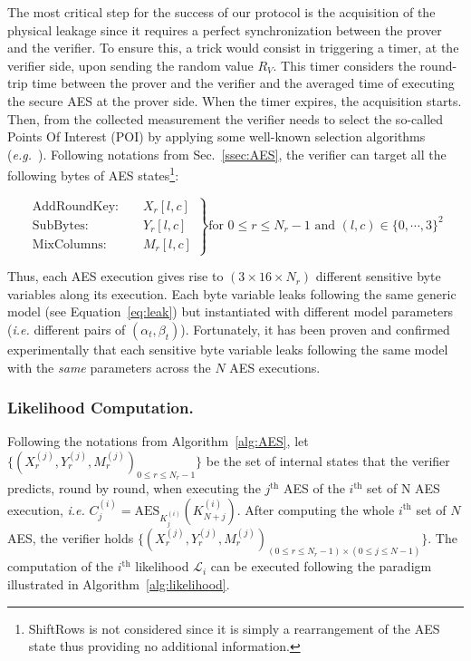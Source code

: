 The most critical step for the success of our protocol is the acquisition of the physical leakage since it requires a perfect synchronization between the prover and the verifier.
To ensure this, a trick would consist in triggering a timer, at the verifier side, upon sending the random value $R_V$. This timer considers the round-trip time between the prover and the verifier and the averaged time of executing the secure AES at the prover side. When the timer expires, the acquisition starts.  
Then, from the collected measurement the verifier needs to select the so-called Points Of Interest (POI) by applying some well-known selection algorithms (\emph{e.g.}~\cite{Choudary2014,Friedman:1974,DBLP:conf/ches/StandaertA08}).
Following notations from Sec.~\ref{ssec:AES}, the verifier can target all the following bytes of AES states\footnote{ShiftRows is not considered since it is simply a rearrangement of the AES state thus providing no additional information.}:

\begin{equation}\label{eq:bytes}
\left.
\begin{array}{lcl}
\mbox{AddRoundKey: }& &  X_r[l,c]\\
\mbox{SubBytes: }  & & {Y_r[l,c]}\\
\mbox{MixColumns:  }& & {M_r[l,c]}
\end{array}\right\} \mbox{for } 0 \leq r \leq N_r - 1 \mbox{ and } (l,c) \in \{0,\cdots,3\}^2
\end{equation}



Thus, each AES execution gives rise to $(3 \times 16 \times N_r)$ different sensitive byte variables along its execution. Each byte variable leaks following the same generic model (see Equation~\eqref{eq:leak}) but instantiated with different model parameters (\emph{i.e.} different pairs of $(\alpha_t, \beta_t)$). Fortunately, it has been proven and confirmed experimentally that each sensitive byte variable leaks following the same model with the {\it same} parameters across the $N$ AES executions. 

\subsubsection{Likelihood Computation.}

Following the notations from Algorithm~\ref{alg:AES}, let $\{ {(X_r^{(j)}, Y_r^{(j)}, M_r^{(j)})}_{0 \leq r \leq N_r - 1}\}$ be the set of internal states that the verifier predicts, round by round, when executing the $j^{\text{th}}$ AES of the $i^{\text{th}}$ set of N AES execution, \emph{i.e.} $C_j^{(i)} = \mbox{AES}_{K_j^{(i)}}(K_{N+j}^{(i)})$.
After computing the whole $i^{\text{th}}$ set of $N$ AES, the verifier holds $\{{(X_r^{(j)}, Y_r^{(j)}, M_r^{(j)})}_{(0 \leq r \leq N_r - 1) \times (0\leq j \leq N-1)}\}$. 
The computation of the $i^{\text{th}}$ likelihood $\mathcal{L}_i$ can be executed following the paradigm illustrated in Algorithm~\ref{alg:likelihood}. 

